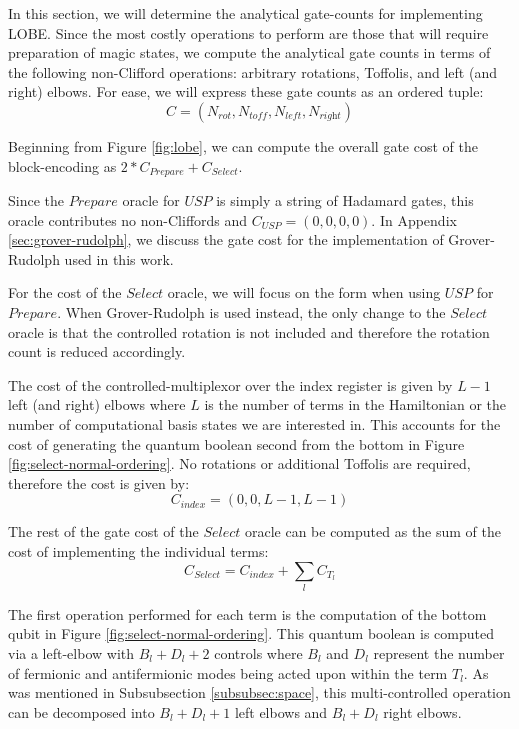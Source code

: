 In this section, we will determine the analytical gate-counts for implementing LOBE.
Since the most costly operations to perform are those that will require preparation of magic states, we compute the analytical gate counts in terms of the following non-Clifford operations: arbitrary rotations, Toffolis, and left (and right) elbows.
For ease, we will express these gate counts as an ordered tuple:
\begin{equation}
    \label{count gates not.}
    C = (N_{\textit{rot}}, N_{\textit{toff}}, N_{\textit{left}}, N_{\textit{right}})
\end{equation}

Beginning from Figure \ref{fig:lobe}, we can compute the overall gate cost of the block-encoding as $2*C_{\textit{Prepare}} + C_{\textit{Select}}$.

Since the $\textit{Prepare}$ oracle for $USP$ is simply a string of Hadamard gates, this oracle contributes no non-Cliffords and $C_{\textit{USP}} = (0, 0, 0, 0)$.
In Appendix \ref{sec:grover-rudolph}, we discuss the gate cost for the implementation of Grover-Rudolph used in this work. 

For the cost of the $\textit{Select}$ oracle, we will focus on the form when using $USP$ for $\textit{Prepare}$.
When Grover-Rudolph is used instead, the only change to the $\textit{Select}$ oracle is that the controlled rotation is not included and therefore the rotation count is reduced accordingly.  

The cost of the controlled-multiplexor over the index register is given by $L - 1$ left (and right) elbows \cite{babbush2018encoding} where $L$ is the number of terms in the Hamiltonian or the number of computational basis states we are interested in.
This accounts for the cost of generating the quantum boolean second from the bottom in Figure \ref{fig:select-normal-ordering}.
No rotations or additional Toffolis are required, therefore the cost is given by: 
\begin{equation}
    C_{\textit{index}} = (0, 0, L-1, L-1)
\end{equation}

The rest of the gate cost of the $\textit{Select}$ oracle can be computed as the sum of the cost of implementing the individual terms:
\begin{equation}
    C_{\textit{Select}} = C_{\textit{index}} + \sum_{l} C_{T_l}
\end{equation}

The first operation performed for each term is the computation of the bottom qubit in Figure \ref{fig:select-normal-ordering}.
This quantum boolean is computed via a left-elbow with $B_l + D_l + 2$ controls where $B_l$ and $D_l$ represent the number of fermionic and antifermionic modes being acted upon within the term $T_l$.
As was mentioned in Subsubsection \ref{subsubsec:space}, this multi-controlled operation can be decomposed into $B_l + D_l + 1$ left elbows and $B_l + D_l$ right elbows.

